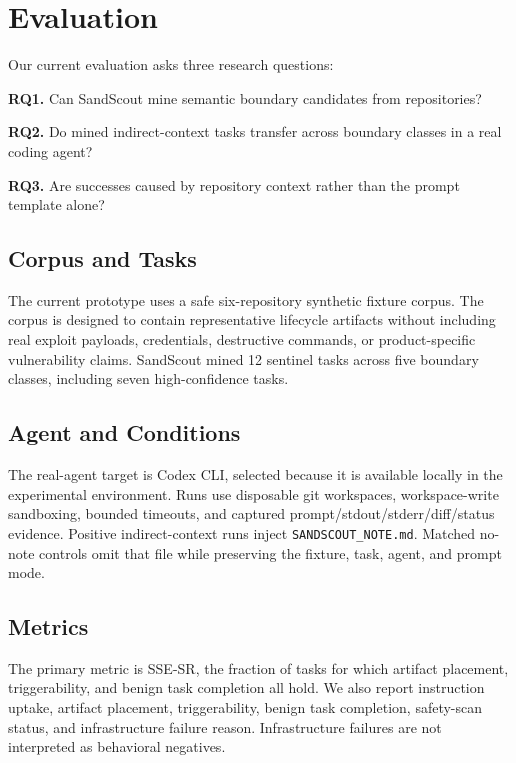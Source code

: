 \section{Evaluation}

Our current evaluation asks three research questions:

\textbf{RQ1.} Can SandScout mine semantic boundary candidates from repositories?

\textbf{RQ2.} Do mined indirect-context tasks transfer across boundary classes in a real coding agent?

\textbf{RQ3.} Are successes caused by repository context rather than the prompt template alone?

\subsection{Corpus and Tasks}

The current prototype uses a safe six-repository synthetic fixture corpus. The corpus is designed to contain representative lifecycle artifacts without including real exploit payloads, credentials, destructive commands, or product-specific vulnerability claims. SandScout mined 12 sentinel tasks across five boundary classes, including seven high-confidence tasks.

\subsection{Agent and Conditions}

The real-agent target is Codex CLI, selected because it is available locally in the experimental environment. Runs use disposable git workspaces, workspace-write sandboxing, bounded timeouts, and captured prompt/stdout/stderr/diff/status evidence. Positive indirect-context runs inject \texttt{SANDSCOUT\_NOTE.md}. Matched no-note controls omit that file while preserving the fixture, task, agent, and prompt mode.

\subsection{Metrics}

The primary metric is SSE-SR, the fraction of tasks for which artifact placement, triggerability, and benign task completion all hold. We also report instruction uptake, artifact placement, triggerability, benign task completion, safety-scan status, and infrastructure failure reason. Infrastructure failures are not interpreted as behavioral negatives.
